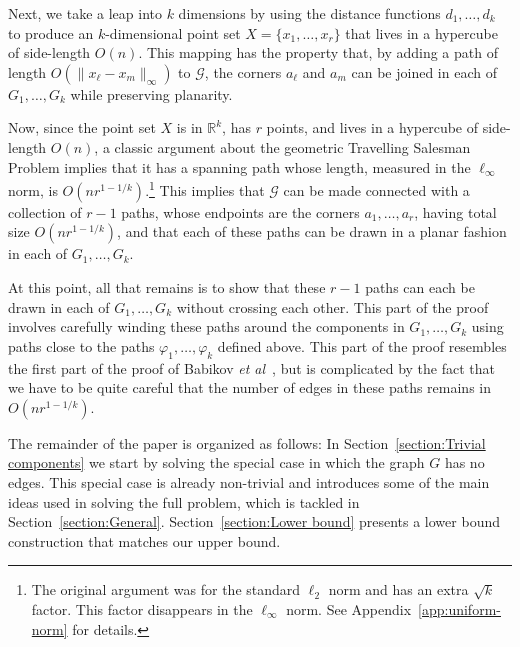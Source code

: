 \documentclass{patmorin}
\newcommand{\etal}{\emph{et al}}
\newcommand{\R}{\mathbb{R}}
\begin{document}
Next, we take a leap into $k$ dimensions by using the distance
functions $d_1,\ldots,d_k$ to produce an $k$-dimensional point set
$X=\{x_1,\ldots,x_r\}$ that lives in a hypercube of side-length $O(n)$.
This mapping has the property that, by adding a path of length $O(\|x_\ell
-x_m\|_\infty)$ to $\mathcal G$, the corners $a_\ell$ and $a_m$ can be joined
in each of $G_1,\ldots,G_k$ while preserving planarity.

Now, since the point set $X$ is in $\R^k$, has $r$ points, and lives in a
hypercube of side-length $O(n)$, a classic argument about the geometric
Travelling Salesman Problem \cite{few:shortest,moran:on} implies that it has a
spanning path whose length, measured in the $\ell_\infty$ norm, is
$O(nr^{1-1/k})$.\footnote{The original argument was for the standard
$\ell_2$ norm and has an extra $\sqrt{k}$ factor.  This factor disappears
in the $\ell_\infty$ norm.  See Appendix~\ref{app:uniform-norm} for details.}
This implies that $\mathcal G$ can be made connected with a collection
of $r-1$ paths, whose endpoints are the corners $a_1,\ldots,a_r$, having
total size $O(nr^{1-1/k})$, and that each of these paths can be
drawn in a planar fashion in each of $G_1,\ldots,G_k$.

At this point, all that remains is to show that these $r-1$ paths
can each be drawn in each of $G_1,\ldots,G_k$ without crossing
each other.  This part of the proof involves carefully winding these
paths around the components in $G_1,\ldots,G_k$ using paths close
to the paths $\varphi_1,\ldots,\varphi_k$ defined above. This part
of the proof resembles the first part of the proof of Babikov \etal\
\cite{babikov.souvaine.ea:constructing}, but is complicated by the fact
that we have to be quite careful that the number of edges in these paths
remains in $O(nr^{1-1/k})$. 


The remainder of the paper is organized as follows: In
Section~\ref{section:Trivial components} we start by solving
the special case in which the graph $G$ has no edges. This
special case is already non-trivial and introduces some of the
main ideas used in solving the full problem, which is tackled in
Section~\ref{section:General}. Section~\ref{section:Lower bound}
presents a lower bound construction that matches our upper bound.
\end{document}
